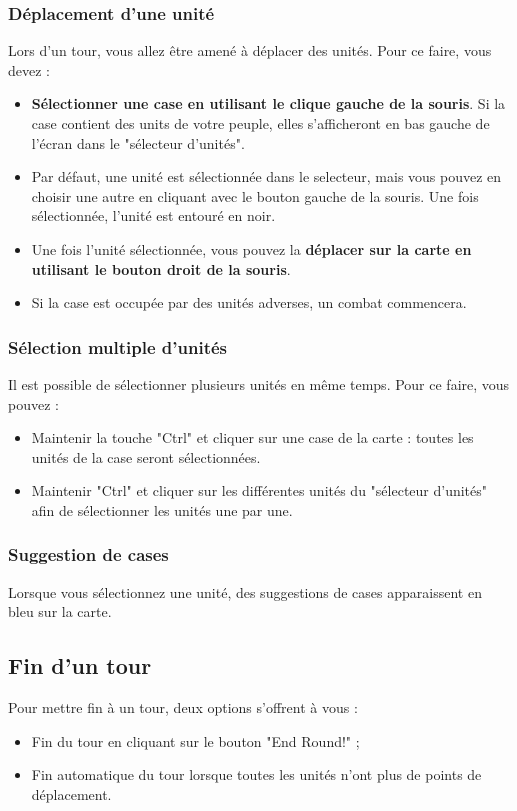 \documentclass[a4paper,12pt]{article}
\begin{document}
\subsubsection{Déplacement d'une unité}
Lors d'un tour, vous allez être amené à déplacer des unités. Pour ce faire, vous devez :
\begin{itemize}
\item \textbf{Sélectionner une case en utilisant le clique gauche de la souris}. Si la case contient des units de votre peuple, elles s'afficheront en bas gauche de l'écran dans le "sélecteur d'unités".
\item Par défaut, une unité est sélectionnée dans le selecteur, mais vous pouvez en choisir une autre en cliquant avec le bouton gauche de la souris. Une fois sélectionnée, l'unité est entouré en noir.
\item Une fois l'unité sélectionnée, vous pouvez la \textbf{déplacer sur la carte en utilisant le bouton droit de la souris}.
\item Si la case est occupée par des unités adverses, un combat commencera.
\end{itemize}

\subsubsection{Sélection multiple d'unités}
Il est possible de sélectionner plusieurs unités en même temps. Pour ce faire, vous pouvez :
\begin{itemize}
\item Maintenir la touche "Ctrl" et cliquer sur une case de la carte : toutes les unités de la case seront sélectionnées.
\item Maintenir "Ctrl" et cliquer sur les différentes unités du "sélecteur d'unités" afin de sélectionner les unités une par une.
\end{itemize}

\subsubsection{Suggestion de cases}
Lorsque vous sélectionnez une unité, des suggestions de cases apparaissent en bleu sur la carte.

\subsection{Fin d'un tour}
Pour mettre fin à un tour, deux options s'offrent à vous :
\begin{itemize}
\item Fin du tour en cliquant sur le bouton "End Round!" ;
\item Fin automatique du tour lorsque toutes les unités n'ont plus de points de déplacement.
\end{itemize}
\end{document}
